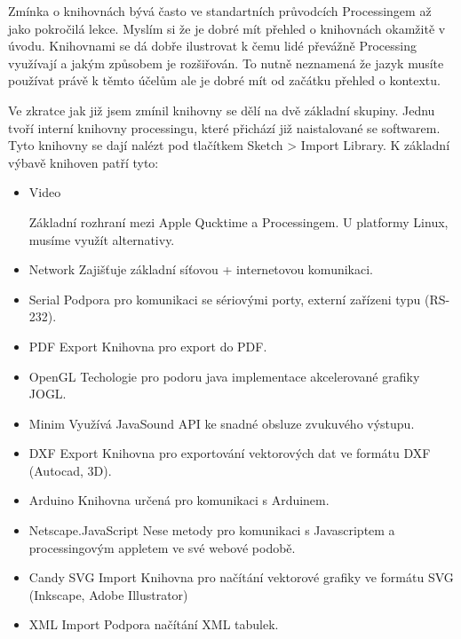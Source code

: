 \documentclass[11pt]{article}
\begin{document}
Zmínka o knihovnách bývá často ve standartních průvodcích Processingem až jako pokročilá lekce. Myslím si že je dobré mít přehled o knihovnách okamžitě v úvodu. Knihovnami se dá dobře ilustrovat k čemu lidé převážně Processing využívají a jakým způsobem je rozšiřován. To nutně neznamená že jazyk musíte používat právě k těmto účelům ale je dobré mít od začátku přehled o kontextu.

Ve zkratce jak již jsem zmínil knihovny se dělí na dvě základní skupiny. Jednu tvoří interní knihovny processingu, které přichází již naistalované se softwarem. Tyto knihovny se dají nalézt pod tlačítkem Sketch > Import Library.
K základní výbavě knihoven patří tyto:

\begin{itemize}
\item
Video

Základní rozhraní mezi Apple Qucktime a Processingem. U platformy Linux, musíme využít alternativy.

\item
Network
Zajišťuje základní síťovou + internetovou komunikaci. 

\item
Serial
Podpora pro komunikaci se sériovými porty, externí zařízeni typu (RS-232).

\item
PDF Export
Knihovna pro export do PDF.

\item
OpenGL
Techologie pro podoru java implementace akcelerované grafiky JOGL.

\item
Minim
Využívá JavaSound API ke snadné obsluze zvukuvého výstupu.

\item
DXF Export
Knihovna pro exportování vektorových dat ve formátu DXF (Autocad, 3D).

\item
Arduino
Knihovna určená pro komunikaci s Arduinem.

\item
Netscape.JavaScript
Nese metody pro komunikaci s Javascriptem a processingovým appletem ve své webové podobě.

\item
Candy SVG Import
Knihovna pro načítání vektorové grafiky ve formátu SVG (Inkscape, Adobe Illustrator)

\item
XML Import
Podpora načítání XML tabulek.
\end{itemize}
\end{document}

